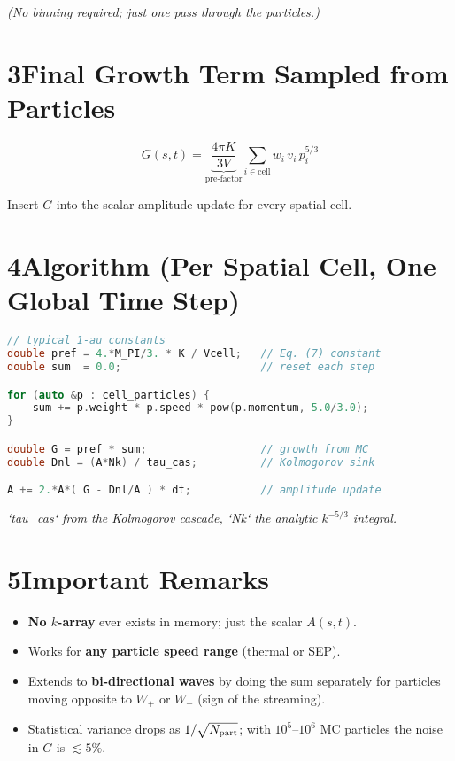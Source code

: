 \textit{(No binning required; just one pass through the particles.)}

\section*{3\quad Final Growth Term Sampled from Particles}

\[
\boxed{ \displaystyle
G(s,t) =
\underbrace{\frac{4\pi K}{3V}}_{\text{pre-factor}}
\sum_{i\in\text{cell}} w_i\,v_i\,p_i^{5/3}
}
\tag{7}
\]

Insert $G$ into the scalar-amplitude update for every spatial cell.

\section*{4\quad Algorithm (Per Spatial Cell, One Global Time Step)}

\begin{lstlisting}[language=C++, basicstyle=\ttfamily\small]
// typical 1-au constants
double pref = 4.*M_PI/3. * K / Vcell;   // Eq. (7) constant
double sum  = 0.0;                      // reset each step

for (auto &p : cell_particles) {
    sum += p.weight * p.speed * pow(p.momentum, 5.0/3.0);
}

double G = pref * sum;                  // growth from MC
double Dnl = (A*Nk) / tau_cas;          // Kolmogorov sink

A += 2.*A*( G - Dnl/A ) * dt;           // amplitude update
\end{lstlisting}

\noindent
\textit{`tau\_cas` from the Kolmogorov cascade, `Nk` the analytic $k^{-5/3}$ integral.}

\section*{5\quad Important Remarks}

\begin{itemize}
\item \textbf{No $k$-array} ever exists in memory; just the scalar $A(s,t)$.
\item Works for \textbf{any particle speed range} (thermal or SEP).
\item Extends to \textbf{bi-directional waves} by doing the sum separately for particles moving opposite to $W_+$ or $W_-$ (sign of the streaming).
\item Statistical variance drops as $1/\sqrt{N_{\rm part}}$; with $10^5$--$10^6$ MC particles the noise in $G$ is $\lesssim 5\%$.
\end{itemize}

